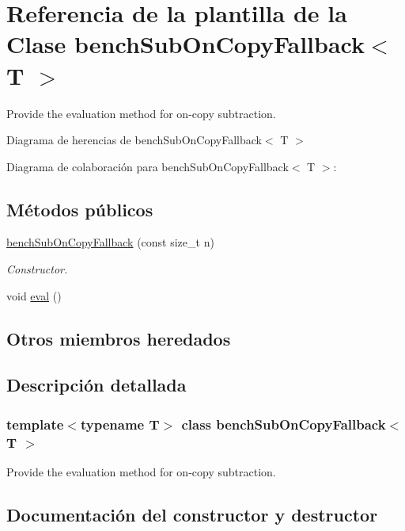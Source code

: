 \hypertarget{classbenchSubOnCopyFallback}{}\section{Referencia de la plantilla de la Clase bench\+Sub\+On\+Copy\+Fallback$<$ T $>$}
\label{classbenchSubOnCopyFallback}


Provide the evaluation method for on-\/copy subtraction.  




Diagrama de herencias de bench\+Sub\+On\+Copy\+Fallback$<$ T $>$


Diagrama de colaboración para bench\+Sub\+On\+Copy\+Fallback$<$ T $>$\+:
\subsection*{Métodos públicos}
\begin{DoxyCompactItemize}
\item 
\hyperlink{classbenchSubOnCopyFallback_acc48cb7186037a15a947191d10af2aa8}{bench\+Sub\+On\+Copy\+Fallback} (const size\+\_\+t n)
\begin{DoxyCompactList}\small\item\em Constructor. \end{DoxyCompactList}\item 
void \hyperlink{classbenchSubOnCopyFallback_a878686956dd5f8d951ba541155c1e68b}{eval} ()
\end{DoxyCompactItemize}
\subsection*{Otros miembros heredados}


\subsection{Descripción detallada}
\subsubsection*{template$<$typename T$>$\newline
class bench\+Sub\+On\+Copy\+Fallback$<$ T $>$}

Provide the evaluation method for on-\/copy subtraction. 

\subsection{Documentación del constructor y destructor}
\mbox{\label{classbenchSubOnCopyFallback_acc48cb7186037a15a947191d10af2aa8}} 
